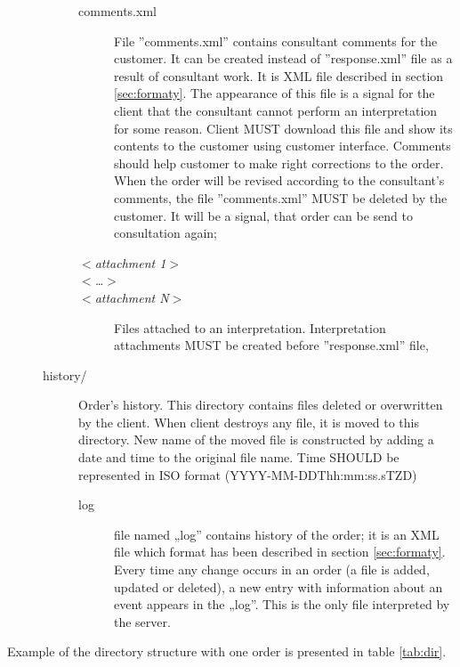 \documentclass[a4paper]{article}
\begin{document}
\begin{description}
\begin{description}
\begin{description}
			\item[comments.xml] File ''comments.xml'' contains consultant comments for the customer. 
			It can be created instead of ''response.xml'' file as a result of consultant work. 
			It is XML file described in section \ref{sec:formaty}. The appearance of this file 
			is a signal for the client that the consultant cannot perform an interpretation 
			for some reason. Client MUST download this 
			file and show its contents to the
			customer using customer interface. Comments should help customer to make right
			corrections to the order. When the order will be revised according to the 
			consultant's comments, the file ''comments.xml'' MUST be deleted by the customer.
			It will be a signal, that order can be send to consultation again;
			\item[$<$\textit{attachment 1}$>$]   
			\item[$<$\textit{\ldots}$>$]   
			\item[$<$\textit{attachment N}$>$] Files attached to an interpretation. 
			Interpretation attachments MUST be created before ''response.xml'' file,
			\end{description}
		\item[history/] Order's history. This directory contains files deleted or
		overwritten by the client. When client destroys any file, it is moved to this
		directory. New name of the moved file is constructed by adding a date and time to
		the original file name. Time SHOULD be represented in ISO format 
		(YYYY-MM-DDThh:mm:ss.sTZD)
			\begin{description}
  			\item[log] file named „log” contains history of the order; it is an XML file 
			which format has been described in section \ref{sec:formaty}. Every time any 
			change occurs in an order (a file is added, updated or deleted), a new entry
			with information about an event appears in the „log”. This is the only file interpreted 
			by the server. 
			\end{description}
		\end{description}
\end{description}

Example of the directory structure with one order is presented in table \ref{tab:dir}.
\end{document}
